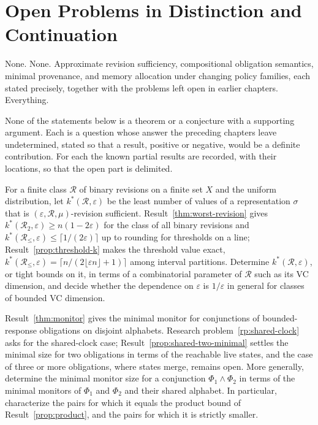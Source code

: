 \chapter{Open Problems in Distinction and Continuation}\label{ch:open}
{None.}
{None.}
{Approximate revision sufficiency, compositional obligation semantics, minimal provenance, and memory allocation under changing policy families, each stated precisely, together with the problems left open in earlier chapters.}
{Everything.}

None of the statements below is a theorem or a conjecture with a supporting argument. Each is a question whose answer the preceding chapters leave undetermined, stated so that a result, positive or negative, would be a definite contribution. For each the known partial results are recorded, with their locations, so that the open part is delimited.

\begin{researchproblem}\label{rp:approx-revision}
For a finite class $\mathcal R$ of binary revisions on a finite set $X$ and the uniform distribution, let $k^{*}(\mathcal R,\varepsilon)$ be the least number of values of a representation $\sigma$ that is $(\varepsilon,\mathcal R,\mu)$-revision sufficient. Result~\ref{thm:worst-revision} gives $k^{*}(\mathcal R_2,\varepsilon)\ge n(1-2\varepsilon)$ for the class of all binary revisions and $k^{*}(\mathcal R_\le,\varepsilon)\le\lceil 1/(2\varepsilon)\rceil$ up to rounding for thresholds on a line; Result~\ref{prop:threshold-k} makes the threshold value exact, $k^{*}(\mathcal R_\le,\varepsilon)=\lceil n/(2\lfloor\varepsilon n\rfloor+1)\rceil$ among interval partitions. Determine $k^{*}(\mathcal R,\varepsilon)$, or tight bounds on it, in terms of a combinatorial parameter of $\mathcal R$ such as its VC dimension, and decide whether the dependence on $\varepsilon$ is $1/\varepsilon$ in general for classes of bounded VC dimension.
\end{researchproblem}

\begin{researchproblem}\label{rp:compositional}
Result~\ref{thm:monitor} gives the minimal monitor for conjunctions of bounded-response obligations on disjoint alphabets. Research problem~\ref{rp:shared-clock} asks for the shared-clock case; Result~\ref{prop:shared-two-minimal} settles the minimal size for two obligations in terms of the reachable live states, and the case of three or more obligations, where states merge, remains open. More generally, determine the minimal monitor size for a conjunction $\Phi_1\wedge\Phi_2$ in terms of the minimal monitors of $\Phi_1$ and $\Phi_2$ and their shared alphabet. In particular, characterize the pairs for which it equals the product bound of Result~\ref{prop:product}, and the pairs for which it is strictly smaller.
\end{researchproblem}

